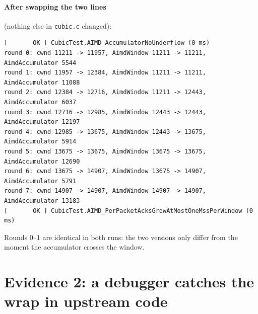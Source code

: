 \documentclass[11pt,a4paper]{article}
\begin{document}
\paragraph{After swapping the two lines} (nothing else in \texttt{cubic.c} changed):
\begin{lstlisting}[style=out]
[       OK ] CubicTest.AIMD_AccumulatorNoUnderflow (0 ms)
round 0: cwnd 11211 -> 11957, AimdWindow 11211 -> 11211, AimdAccumulator 5544
round 1: cwnd 11957 -> 12384, AimdWindow 11211 -> 11211, AimdAccumulator 11088
round 2: cwnd 12384 -> 12716, AimdWindow 11211 -> 12443, AimdAccumulator 6037
round 3: cwnd 12716 -> 12985, AimdWindow 12443 -> 12443, AimdAccumulator 12197
round 4: cwnd 12985 -> 13675, AimdWindow 12443 -> 13675, AimdAccumulator 5914
round 5: cwnd 13675 -> 13675, AimdWindow 13675 -> 13675, AimdAccumulator 12690
round 6: cwnd 13675 -> 14907, AimdWindow 13675 -> 14907, AimdAccumulator 5791
round 7: cwnd 14907 -> 14907, AimdWindow 14907 -> 14907, AimdAccumulator 13183
[       OK ] CubicTest.AIMD_PerPacketAcksGrowAtMostOneMssPerWindow (0 ms)
\end{lstlisting}
Rounds 0--1 are identical in both runs: the two versions only differ from the
moment the accumulator crosses the window.

\section{Evidence 2: a debugger catches the wrap in upstream code}
\label{sec:gdb}
\end{document}

